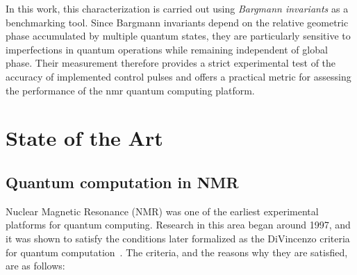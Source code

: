 In this work, this characterization is carried out using \emph{Bargmann invariants} as a benchmarking tool. Since Bargmann invariants depend on the relative geometric phase accumulated by multiple quantum states, they are particularly sensitive to imperfections in quantum operations while remaining independent of global phase. Their measurement therefore provides a strict experimental test of the accuracy of implemented control pulses and offers a practical metric for assessing the performance of the \ac{nmr} quantum computing platform.

\section{State of the Art}

\subsection{Quantum computation in NMR}

Nuclear Magnetic Resonance (NMR) was one of the earliest experimental platforms for quantum computing. Research in this area began around 1997, and it was shown to satisfy the conditions later formalized as the DiVincenzo criteria for quantum computation~\cite{DiVincenzo_2000, Cory_1998_first}. The criteria, and the reasons why they are satisfied, are as follows:

